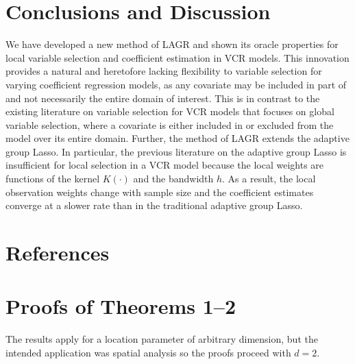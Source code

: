 \documentclass[authoryear,review, 12pt]{elsarticle}
\begin{document}

\section{Conclusions and Discussion \label{section-conclusion}}

We have developed a new method of LAGR and shown its oracle properties
for local variable selection and coefficient estimation in VCR models.
This innovation provides a natural and heretofore lacking flexibility to variable selection for
varying coefficient regression models, as any covariate may be included
in part of and not necessarily the entire domain of interest.
This is in contrast to the existing literature on variable selection
for VCR models that focuses on global variable selection, where a covariate is either 
included in or excluded from the model over its entire domain. Further,
the method of LAGR extends the adaptive group Lasso. In particular,
the previous literature on the adaptive group Lasso is insufficient
for local selection in a VCR model because the local weights are functions
of the kernel $K(\cdot)$ and the bandwidth $h$. As a result, the
local observation weights change with sample size and the coefficient
estimates converge at a slower rate than in the traditional adaptive
group Lasso.

\section*{References}



\appendix

\section{Proofs of Theorems 1--2}
The results apply for a location parameter of arbitrary dimension, but the intended application was spatial analysis so the proofs proceed with $d=2$.
\end{document}
